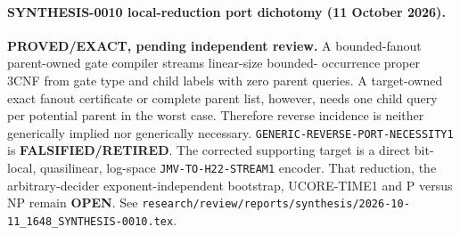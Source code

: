 \paragraph{SYNTHESIS-0010 local-reduction port dichotomy (11 October 2026).}
\textbf{PROVED/EXACT, pending independent review.}
A bounded-fanout parent-owned gate compiler streams linear-size bounded-
occurrence proper 3CNF from gate type and child labels with zero parent
queries.  A target-owned exact fanout certificate or complete parent list,
however, needs one child query per potential parent in the worst case.
Therefore reverse incidence is neither generically implied nor generically
necessary.  \texttt{GENERIC-REVERSE-PORT-NECESSITY1} is
\textbf{FALSIFIED/RETIRED}.  The corrected supporting target is a direct
bit-local, quasilinear, log-space \texttt{JMV-TO-H22-STREAM1} encoder.  That
reduction, the arbitrary-decider exponent-independent bootstrap, UCORE-TIME1
and P versus NP remain \textbf{OPEN}.  See
\texttt{research/review/reports/synthesis/2026-10-11\_1648\_SYNTHESIS-0010.tex}.
